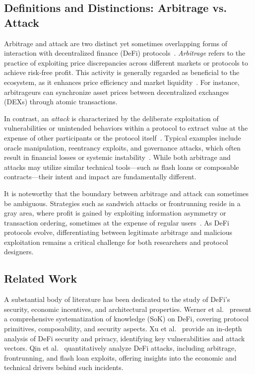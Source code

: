 \documentclass[conference]{IEEEtran}
\begin{document}
\subsection{Definitions and Distinctions: Arbitrage vs. Attack}
Arbitrage and attack are two distinct yet sometimes overlapping forms of interaction with decentralized finance (DeFi) protocols~\cite{qin2022quantifying, werner2021sok}. \textit{Arbitrage} refers to the practice of exploiting price discrepancies across different markets or protocols to achieve risk-free profit. This activity is generally regarded as beneficial to the ecosystem, as it enhances price efficiency and market liquidity~\cite{xu2021sok, daian2020flash}. For instance, arbitrageurs can synchronize asset prices between decentralized exchanges (DEXs) through atomic transactions.

In contrast, an \textit{attack} is characterized by the deliberate exploitation of vulnerabilities or unintended behaviors within a protocol to extract value at the expense of other participants or the protocol itself~\cite{qin2022quantifying}. Typical examples include oracle manipulation, reentrancy exploits, and governance attacks, which often result in financial losses or systemic instability~\cite{werner2021sok, xu2021sok}. While both arbitrage and attacks may utilize similar technical tools---such as flash loans or composable contracts---their intent and impact are fundamentally different.

It is noteworthy that the boundary between arbitrage and attack can sometimes be ambiguous. Strategies such as sandwich attacks or frontrunning reside in a gray area, where profit is gained by exploiting information asymmetry or transaction ordering, sometimes at the expense of regular users~\cite{qin2022quantifying}. As DeFi protocols evolve, differentiating between legitimate arbitrage and malicious exploitation remains a critical challenge for both researchers and protocol designers.

\subsection{Related Work}
A substantial body of literature has been dedicated to the study of DeFi's security, economic incentives, and architectural properties. Werner et al.~\cite{werner2021sok} present a comprehensive systematization of knowledge (SoK) on DeFi, covering protocol primitives, composability, and security aspects. Xu et al.~\cite{xu2021sok} provide an in-depth analysis of DeFi security and privacy, identifying key vulnerabilities and attack vectors. Qin et al.~\cite{qin2022quantifying} quantitatively analyze DeFi attacks, including arbitrage, frontrunning, and flash loan exploits, offering insights into the economic and technical drivers behind such incidents.
\end{document}
